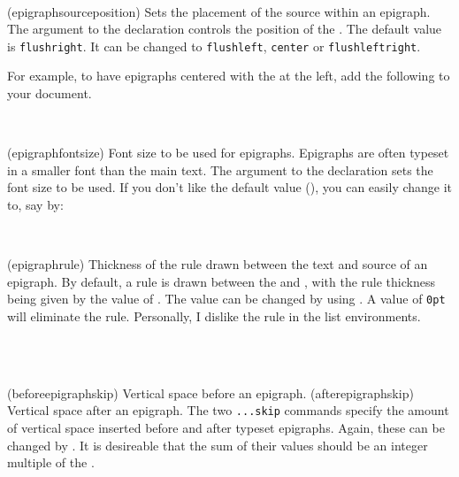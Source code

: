 \begin{syntax}
 \cmd{\epigraphsourceposition} \\
\end{syntax}
\glossary(epigraphsourceposition)%
  {}%
  {Sets the placement of the source within an epigraph.}
 The  argument to the \cmd{\epigraphsourceposition}
declaration controls the position 
of the .
 The default value is \texttt{flushright}. It can be changed to
 \texttt{flushleft}, \texttt{center} or \texttt{flushleftright}.

 For example, to have epigraphs centered with the  at the left,
 add the following to your document.
 \begin{lcode}
 \end{lcode}

\begin{syntax}
\cmd{\epigraphfontsize} \\
\end{syntax}
\glossary(epigraphfontsize)%
  {}%
  {Font size to be used for epigraphs.}
 Epigraphs are often typeset in a smaller font than the main text. The
 argument to the \cmd{\epigraphfontsize}
declaration sets the font size to be used.
 If you don't like the default value (\cmd{\small}), you can easily change
it to, say \cmd{\footnotesize} by:
\begin{lcode}
\epigraphfontsize{\footnotesize}
\end{lcode}
		
\begin{syntax}
 \lnc{\epigraphrule} \\
\end{syntax}
\glossary(epigraphrule)%
  {}%
  {Thickness of the rule drawn between the text and source of an epigraph.}
 By default, a rule is drawn between the  and ,
 with the rule thickness being given by the value of \lnc{\epigraphrule}.
 The value can be changed by using \cmd{\setlength}.
 A value of \texttt{0pt} will eliminate the rule. Personally, I dislike
 the rule in the list environments.

\begin{syntax}
 \lnc{\beforeepigraphskip} \\
 \lnc{\afterepigraphskip} \\
\end{syntax}
\glossary(beforeepigraphskip)%
  {}%
  {Vertical space before an epigraph.}
\glossary(afterepigraphskip)%
  {}%
  {Vertical space after an epigraph.}
 The two \verb?...skip? commands specify the amount of vertical space inserted
 before and after typeset epigraphs. Again, these can be changed by
 \cmd{\setlength}. It is desireable that the sum of their values should be an 
 integer multiple of the \lnc{\baselineskip}.

